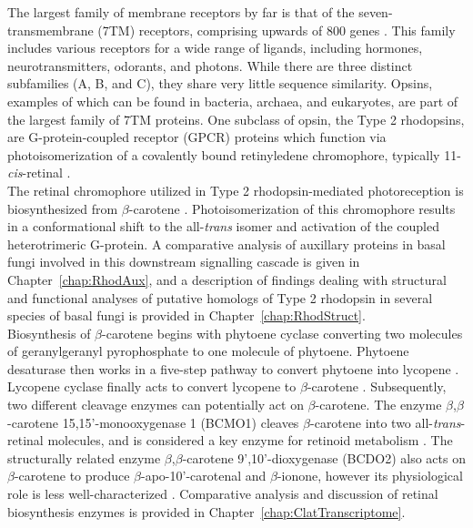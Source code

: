 \indent The largest family of membrane receptors by far is that of the seven-transmembrane (7TM) receptors, comprising upwards of 800 genes \cite{Pierce2002}. This family includes various receptors for a wide range of ligands, including hormones, neurotransmitters, odorants, and photons. While there are three distinct subfamilies (A, B, and C), they share very little sequence similarity. Opsins, examples of which can be found in bacteria, archaea, and eukaryotes, are part of the largest family of 7TM proteins. One subclass of opsin, the Type 2 rhodopsins, are G-protein-coupled receptor (GPCR) proteins which function via photoisomerization of a covalently bound retinyledene chromophore, typically 11-\textit{cis}-retinal \cite{Wald1968}.\\
\indent The retinal chromophore utilized in Type 2 rhodopsin-mediated photoreception is biosynthesized from $\beta$-carotene \cite{VonLintig2000}. Photoisomerization of this chromophore results in a conformational shift to the all-\textit{trans} isomer \cite{Smith2010} and activation of the coupled heterotrimeric G-protein. A comparative analysis of auxillary proteins in basal fungi involved in this downstream signalling cascade is given in Chapter~\ref{chap:RhodAux}, and a description of findings dealing with structural and functional analyses of putative homologs of Type 2 rhodopsin in several species of basal fungi is provided in Chapter~\ref{chap:RhodStruct}.\\
\indent Biosynthesis of $\beta$-carotene begins with phytoene cyclase converting two molecules of geranylgeranyl pyrophosphate to one molecule of phytoene. Phytoene desaturase then works in a five-step pathway to convert phytoene into lycopene \cite{Hausmann2000}. Lycopene cyclase finally acts to convert lycopene to $\beta$-carotene \cite{Cunningham1994}. Subsequently, two different cleavage enzymes can potentially act on $\beta$-carotene. The enzyme $\beta$,$\beta$-carotene 15,15'-monooxygenase 1 (BCMO1) cleaves $\beta$-carotene into two all-\textit{trans}-retinal molecules, and is considered a key enzyme for retinoid metabolism \cite{Lietz2012}. The structurally related enzyme $\beta$,$\beta$-carotene 9',10'-dioxygenase (BCDO2) also acts on $\beta$-carotene to produce $\beta$-apo-10'-carotenal and $\beta$-ionone, however its physiological role is less well-characterized \cite{Lobo2012}. Comparative analysis and discussion of retinal biosynthesis enzymes is provided in Chapter~\ref{chap:ClatTranscriptome}.\\
